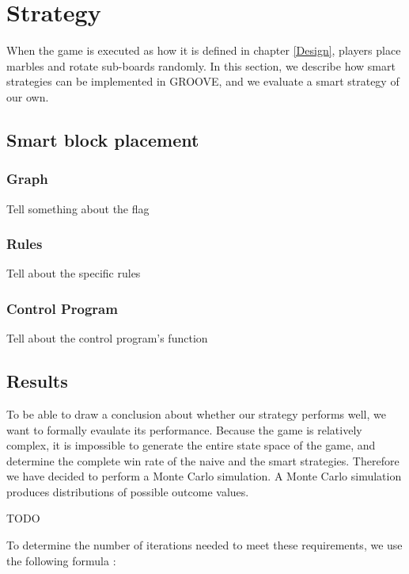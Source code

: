 \section{Strategy}
\label{Strategy}
When the game is executed as how it is defined in chapter \ref{Design}, players place marbles and rotate sub-boards randomly.
In this section, we describe how smart strategies can be implemented in GROOVE, and we evaluate a smart strategy of our own.

\subsection{Smart block placement}

\subsubsection{Graph}
Tell something about the flag

\subsubsection{Rules}
Tell about the specific rules

\subsubsection{Control Program}
Tell about the control program's function

\subsection{Results}
To be able to draw a conclusion about whether our strategy performs well, we want to formally evaulate its performance.
Because the game is relatively complex, it is impossible to generate the entire state space of the game, and determine the complete win rate of the naive and the smart strategies.
Therefore we have decided to perform a Monte Carlo simulation. A Monte Carlo simulation produces distributions of possible outcome values.

\vspace{6pt}

TODO

To determine the number of iterations needed to meet these requirements, we use the following formula \cite{sim-modeling}:

